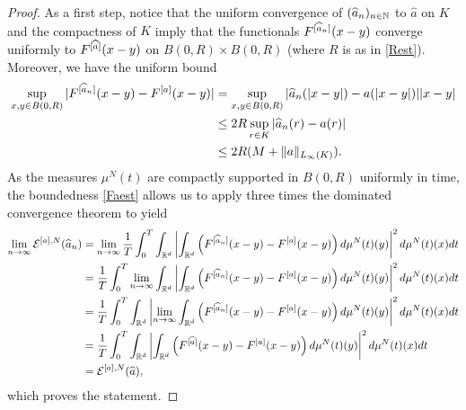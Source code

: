 \begin{proof}
As a first step, notice that the uniform convergence of $(\widehat a_n)_{n \in \mathbb{N}}$ to $\widehat a$ on $K$ and the compactness of $K$ imply that the functionals $F^{[\widehat a_n]}(x-y)$ converge uniformly to $F^{[\widehat a]}(x-y)$ on $B(0,R)\times B(0,R)$ (where $R$ is as in \eqref{Rest}). Moreover, we have the uniform bound
\begin{align}
\begin{split}\label{Faest}
\sup_{x,y\in B(0,R)}|F^{[\widehat a_n]}(x-y) - F^{[a]}(x-y)| &= \sup_{x,y\in B(0,R)}|\widehat a_n(|x-y|) -  a(|x-y|)| |x-y| \\
&\leq 2R \sup_{r\in K} |\widehat a_n(r) -  a(r)| \\
& \leq 2R(M + \|a\|_{L_{\infty}(K)}).
\end{split}
\end{align}
As the measures $\mu^N(t)$ are compactly supported in $B(0,R)$ uniformly in time, the boundedness \eqref{Faest} allows us to apply three times the dominated convergence theorem to yield
\begin{align*}
\lim_{n \rightarrow \infty}  \mathcal E^{[a],N} (\widehat a_n) &= \lim_{n \rightarrow \infty}\frac{1}{T}\int_0^T\int_{\mathbb{R}^d} \left| \int_{\mathbb{R}^d}
			\left(F^{[\widehat a_n]}(x-y)-F^{[a]}(x-y)\right)d\mu^N(t)(y)\right|^2d\mu^N(t)(x) dt\\
			&= \frac{1}{T}\int_0^T\lim_{n \rightarrow \infty}\int_{\mathbb{R}^d} \left| \int_{\mathbb{R}^d}
			\left(F^{[\widehat a_n]}(x-y)-F^{[a]}(x-y)\right)d\mu^N(t)(y)\right|^2 d\mu^N(t)(x) dt\\
			&= \frac{1}{T}\int_0^T\int_{\mathbb{R}^d} \left| \lim_{n \rightarrow \infty}\int_{\mathbb{R}^d}
			\left(F^{[\widehat a_n]}(x-y)-F^{[a]}(x-y)\right)d\mu^N(t)(y)\right|^2 d\mu^N(t)(x) dt\\
			&= \frac{1}{T}\int_0^T\int_{\mathbb{R}^d} \left| \int_{\mathbb{R}^d}
			\left(F^{[\widehat a]}(x-y)-F^{[a]}(x-y)\right)d\mu^N(t)(y)\right|^2 d\mu^N(t)(x) dt\\
&=  \mathcal E^{[a],N}(\widehat a),
\end{align*}
which proves the statement.





\end{proof}
